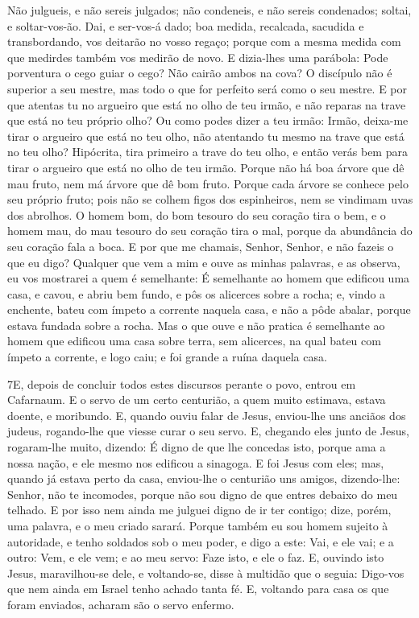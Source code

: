 Não julgueis, e não sereis julgados; não condeneis, e não sereis
condenados; soltai, e soltar-vos-ão. Dai, e ser-vos-á dado;
boa medida, recalcada, sacudida e transbordando, vos deitarão no
vosso regaço; porque com a mesma medida com que medirdes também vos
medirão de novo. E dizia-lhes uma parábola: Pode porventura o
cego guiar o cego? Não cairão ambos na cova? O discípulo não
é superior a seu mestre, mas todo o que for perfeito será como o seu
mestre. E por que atentas tu no argueiro que está no olho de
teu irmão, e não reparas na trave que está no teu próprio olho?
Ou como podes dizer a teu irmão: Irmão, deixa-me tirar o
argueiro que está no teu olho, não atentando tu mesmo na trave que
está no teu olho? Hipócrita, tira primeiro a trave do teu olho, e
então verás bem para tirar o argueiro que está no olho de teu irmão.
Porque não há boa árvore que dê mau fruto, nem má árvore que
dê bom fruto. Porque cada árvore se conhece pelo seu próprio
fruto; pois não se colhem figos dos espinheiros, nem se vindimam
uvas dos abrolhos. O homem bom, do bom tesouro do seu coração
tira o bem, e o homem mau, do mau tesouro do seu coração tira o mal,
porque da abundância do seu coração fala a boca. E por que me
chamais, Senhor, Senhor, e não fazeis o que eu digo? Qualquer
que vem a mim e ouve as minhas palavras, e as observa, eu vos
mostrarei a quem é semelhante: É semelhante ao homem que
edificou uma casa, e cavou, e abriu bem fundo, e pôs os alicerces
sobre a rocha; e, vindo a enchente, bateu com ímpeto a corrente
naquela casa, e não a pôde abalar, porque estava fundada sobre a
rocha. Mas o que ouve e não pratica é semelhante ao homem que
edificou uma casa sobre terra, sem alicerces, na qual bateu com
ímpeto a corrente, e logo caiu; e foi grande a ruína daquela casa.

\medskip

\lettrine{7} E, depois de concluir todos estes discursos
perante o povo, entrou em Cafarnaum. E o servo de um certo
centurião, a quem muito estimava, estava doente, e moribundo. E,
quando ouviu falar de Jesus, enviou-lhe uns anciãos dos judeus,
rogando-lhe que viesse curar o seu servo. E, chegando eles junto
de Jesus, rogaram-lhe muito, dizendo: É digno de que lhe concedas
isto, porque ama a nossa nação, e ele mesmo nos edificou a
sinagoga. E foi Jesus com eles; mas, quando já estava perto da
casa, enviou-lhe o centurião uns amigos, dizendo-lhe: Senhor, não te
incomodes, porque não sou digno de que entres debaixo do meu
telhado. E por isso nem ainda me julguei digno de ir ter
contigo; dize, porém, uma palavra, e o meu criado sarará. Porque
também eu sou homem sujeito à autoridade, e tenho soldados sob o meu
poder, e digo a este: Vai, e ele vai; e a outro: Vem, e ele vem; e
ao meu servo: Faze isto, e ele o faz. E, ouvindo isto Jesus,
maravilhou-se dele, e voltando-se, disse à multidão que o seguia:
Digo-vos que nem ainda em Israel tenho achado tanta fé. E,
voltando para casa os que foram enviados, acharam são o servo
enfermo.

